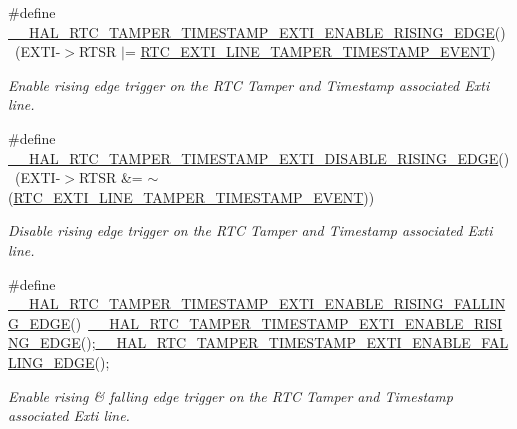 \begin{DoxyCompactItemize}
\#define \hyperlink{group___r_t_c_ex___tamper___timestamp_ga5ef935272d3dab31a290ece5da96ccab}{\+\_\+\+\_\+\+H\+A\+L\+\_\+\+R\+T\+C\+\_\+\+T\+A\+M\+P\+E\+R\+\_\+\+T\+I\+M\+E\+S\+T\+A\+M\+P\+\_\+\+E\+X\+T\+I\+\_\+\+E\+N\+A\+B\+L\+E\+\_\+\+R\+I\+S\+I\+N\+G\+\_\+\+E\+D\+GE}()~(E\+X\+TI-\/$>$R\+T\+SR $\vert$= \hyperlink{group___r_t_c_ex___private___constants_gaffa3448885f1dec216899aef7f49471f}{R\+T\+C\+\_\+\+E\+X\+T\+I\+\_\+\+L\+I\+N\+E\+\_\+\+T\+A\+M\+P\+E\+R\+\_\+\+T\+I\+M\+E\+S\+T\+A\+M\+P\+\_\+\+E\+V\+E\+NT})
\begin{DoxyCompactList}\small\item\em Enable rising edge trigger on the R\+TC Tamper and Timestamp associated Exti line. \end{DoxyCompactList}\item 
\#define \hyperlink{group___r_t_c_ex___tamper___timestamp_gabe277f7ac75d1fc82355c8e0620cd94d}{\+\_\+\+\_\+\+H\+A\+L\+\_\+\+R\+T\+C\+\_\+\+T\+A\+M\+P\+E\+R\+\_\+\+T\+I\+M\+E\+S\+T\+A\+M\+P\+\_\+\+E\+X\+T\+I\+\_\+\+D\+I\+S\+A\+B\+L\+E\+\_\+\+R\+I\+S\+I\+N\+G\+\_\+\+E\+D\+GE}()~(E\+X\+TI-\/$>$R\+T\+SR \&= $\sim$(\hyperlink{group___r_t_c_ex___private___constants_gaffa3448885f1dec216899aef7f49471f}{R\+T\+C\+\_\+\+E\+X\+T\+I\+\_\+\+L\+I\+N\+E\+\_\+\+T\+A\+M\+P\+E\+R\+\_\+\+T\+I\+M\+E\+S\+T\+A\+M\+P\+\_\+\+E\+V\+E\+NT}))
\begin{DoxyCompactList}\small\item\em Disable rising edge trigger on the R\+TC Tamper and Timestamp associated Exti line. \end{DoxyCompactList}\item 
\#define \hyperlink{group___r_t_c_ex___tamper___timestamp_ga6f34930a42c227b700053b0c0aa7c3d3}{\+\_\+\+\_\+\+H\+A\+L\+\_\+\+R\+T\+C\+\_\+\+T\+A\+M\+P\+E\+R\+\_\+\+T\+I\+M\+E\+S\+T\+A\+M\+P\+\_\+\+E\+X\+T\+I\+\_\+\+E\+N\+A\+B\+L\+E\+\_\+\+R\+I\+S\+I\+N\+G\+\_\+\+F\+A\+L\+L\+I\+N\+G\+\_\+\+E\+D\+GE}()~\hyperlink{group___r_t_c_ex___tamper___timestamp_ga5ef935272d3dab31a290ece5da96ccab}{\+\_\+\+\_\+\+H\+A\+L\+\_\+\+R\+T\+C\+\_\+\+T\+A\+M\+P\+E\+R\+\_\+\+T\+I\+M\+E\+S\+T\+A\+M\+P\+\_\+\+E\+X\+T\+I\+\_\+\+E\+N\+A\+B\+L\+E\+\_\+\+R\+I\+S\+I\+N\+G\+\_\+\+E\+D\+GE}();\hyperlink{group___r_t_c_ex___tamper___timestamp_gabb12ed2c9038c54efe541eed19fd8aa3}{\+\_\+\+\_\+\+H\+A\+L\+\_\+\+R\+T\+C\+\_\+\+T\+A\+M\+P\+E\+R\+\_\+\+T\+I\+M\+E\+S\+T\+A\+M\+P\+\_\+\+E\+X\+T\+I\+\_\+\+E\+N\+A\+B\+L\+E\+\_\+\+F\+A\+L\+L\+I\+N\+G\+\_\+\+E\+D\+GE}();
\begin{DoxyCompactList}\small\item\em Enable rising \& falling edge trigger on the R\+TC Tamper and Timestamp associated Exti line. \end{DoxyCompactList}\item 

\end{DoxyCompactItemize}
